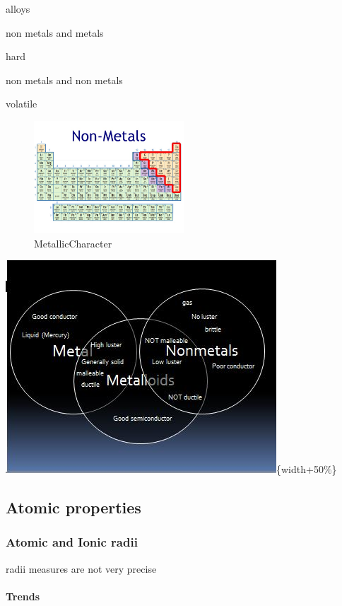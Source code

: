 \documentclass[]{article}
\let\oldparagraph\paragraph
\renewcommand{\paragraph}[1]{\oldparagraph{#1}\mbox{}}
\begin{document}
alloys

non metals and metals

hard

non metals and non metals

volatile

\begin{figure}
\centering
\includegraphics[width=0.5\textwidth,height=\textheight]{Images/MetalsPeriodicTable.jpg}
\caption{MetallicCharacter}
\end{figure}

\includegraphics{Images/MetalsVennDiagram.jpg}\{width+50\%\}

\hypertarget{atomic-properties}{%
\subsection{Atomic properties}\label{atomic-properties}}

\hypertarget{atomic-and-ionic-radii}{%
\subsubsection{Atomic and Ionic radii}\label{atomic-and-ionic-radii}}

radii measures are not very precise

\hypertarget{trends-1}{%
\paragraph{Trends}\label{trends-1}}
\end{document}

